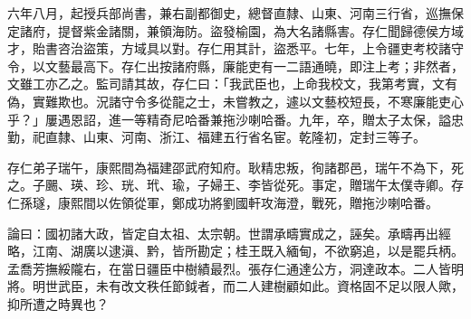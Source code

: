 \begin{pinyinscope}
六年八月，起授兵部尚書，兼右副都御史，總督直隸、山東、河南三行省，巡撫保定諸府，提督紫金諸關，兼領海防。盜發榆園，為大名諸縣害。存仁聞歸德侯方域才，貽書咨治盜策，方域具以對。存仁用其計，盜悉平。七年，上令疆吏考校諸守令，以文藝最高下。存仁出按諸府縣，廉能吏有一二語通曉，即注上考；非然者，文雖工亦乙之。監司請其故，存仁曰：「我武臣也，上命我校文，我第考實，文有偽，實難欺也。況諸守令多從龍之士，未嘗教之，遽以文藝校短長，不寒廉能吏心乎？」屢遇恩詔，進一等精奇尼哈番兼拖沙喇哈番。九年，卒，贈太子太保，謚忠勤，祀直隸、山東、河南、浙江、福建五行省名宦。乾隆初，定封三等子。

存仁弟子瑞午，康熙間為福建邵武府知府。耿精忠叛，徇諸郡邑，瑞午不為下，死之。子颺、瑛、珍、珖、玳、瑜，子婦王、李皆從死。事定，贈瑞午太僕寺卿。存仁孫璲，康熙間以佐領從軍，鄭成功將劉國軒攻海澄，戰死，贈拖沙喇哈番。

論曰：國初諸大政，皆定自太祖、太宗朝。世謂承疇實成之，誣矣。承疇再出經略，江南、湖廣以逮滇、黔，皆所勘定；桂王既入緬甸，不欲窮追，以是罷兵柄。孟喬芳撫綏隴右，在當日疆臣中樹績最烈。張存仁通達公方，洞達政本。二人皆明將。明世武臣，未有改文秩任節鉞者，而二人建樹顧如此。資格固不足以限人歟，抑所遭之時異也？


\end{pinyinscope}